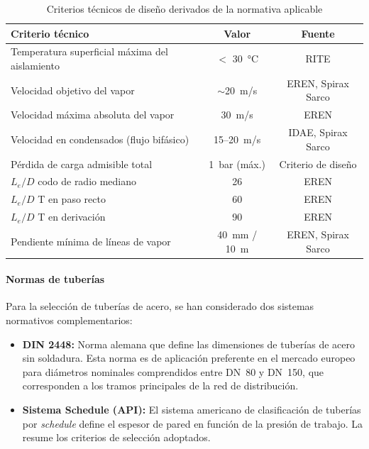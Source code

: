 \begin{table}[H]
	\centering
	\caption{Criterios técnicos de diseño derivados de la normativa aplicable}
	\label{tab:criterios-tecnicos-normativa}
	\begin{tabular}{p{5.5cm}cc}
		\toprule
		\textbf{Criterio técnico}                      & \textbf{Valor} & \textbf{Fuente}    \\
		\midrule
		Temperatura superficial máxima del aislamiento & $<$ 30~°C      & RITE               \\
		Velocidad objetivo del vapor                   & $\sim$20~m/s   & EREN, Spirax Sarco \\
		Velocidad máxima absoluta del vapor            & 30~m/s         & EREN               \\
		Velocidad en condensados (flujo bifásico)      & 15--20~m/s     & IDAE, Spirax Sarco \\
		Pérdida de carga admisible total               & 1~bar (máx.)   & Criterio de diseño \\
		$L_e/D$ codo de radio mediano                  & 26             & EREN               \\
		$L_e/D$ T en paso recto                        & 60             & EREN               \\
		$L_e/D$ T en derivación                        & 90             & EREN               \\
		Pendiente mínima de líneas de vapor            & 40~mm / 10~m   & EREN, Spirax Sarco \\
		\bottomrule
	\end{tabular}
\end{table}

\paragraph{Normas de tuberías}

Para la selección de tuberías de acero, se han considerado dos sistemas normativos complementarios:

\begin{itemize}[leftmargin=2em]
	\item \textbf{DIN 2448:} Norma alemana que define las dimensiones de tuberías de acero sin soldadura. Esta norma es de aplicación preferente en el mercado europeo para diámetros nominales comprendidos entre DN~80 y DN~150, que corresponden a los tramos principales de la red de distribución.

	\item \textbf{Sistema Schedule (API):} El sistema americano de clasificación de tuberías por \textit{schedule} define el espesor de pared en función de la presión de trabajo. La  resume los criterios de selección adoptados.
\end{itemize}

